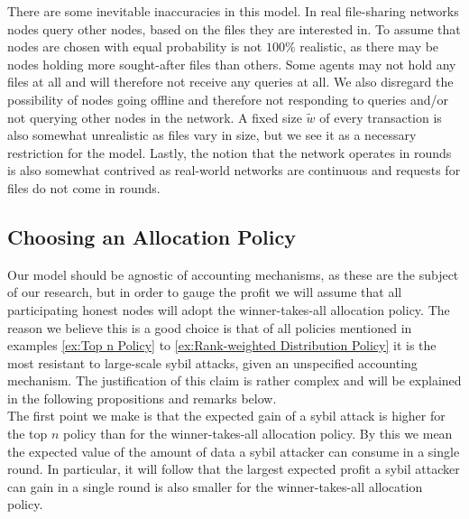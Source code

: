 \noindent{}There are some inevitable inaccuracies in this model. In real file-sharing networks nodes query other nodes, based on the files they are interested in. To assume that nodes are chosen with equal probability is not $100\%$ realistic, as there may be nodes holding more sought-after files than others. Some agents may not hold any files at all and will therefore not receive any queries at all. We also disregard the possibility of nodes going offline and therefore not responding to queries and/or not querying other nodes in the network. A fixed size $\tilde{w}$ of every transaction is also somewhat unrealistic as files vary in size, but we see it as a necessary restriction for the model. Lastly, the notion that the network operates in rounds is also somewhat contrived as real-world networks are continuous and requests for files do not come in rounds. \vspace{1em}\\

\subsection{Choosing an Allocation Policy}
\label{subsec:Allocation Policies}
\noindent{}Our model should be agnostic of accounting mechanisms, as these are the subject of our research, but in order to gauge the profit  we will assume that all participating honest nodes will adopt the winner-takes-all allocation policy. The reason we believe this is a good choice is that of all policies mentioned in examples \ref{ex:Top n Policy} to \ref{ex:Rank-weighted Distribution Policy} it is the most resistant to large-scale sybil attacks, given an unspecified accounting mechanism. The justification of this claim is rather complex and will be explained in the following propositions and remarks below. \vspace{1em}\\

\noindent{}The first point we make is that the expected gain of a sybil attack is higher for the top $n$ policy than for the winner-takes-all allocation policy. By this we mean the expected value of the amount of data a sybil attacker can consume in a single round. In particular, it will follow that the largest expected profit a sybil attacker can gain in a single round is also smaller for the winner-takes-all allocation policy. \vspace{1em}\\

